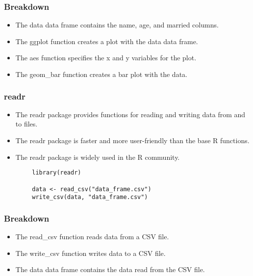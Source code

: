 \documentclass[serif, 9pt, aspectratio=32]{beamer}
\begin{document}
\begin{frame}
    \centering
    \frametitle{Breakdown}
    \begin{itemize}
        \setlength{\itemsep}{2em}
        \item The data data frame contains the name, age, and married columns.
        \item The ggplot function creates a plot with the data data frame.
        \item The aes function specifies the x and y variables for the plot.
        \item The geom\_bar function creates a bar plot with the data.
    \end{itemize}
\end{frame}

\begin{frame}
    \centering
    \frametitle{readr}
    \begin{itemize}
        \setlength{\itemsep}{2em}
        \item The readr package provides functions for reading and writing data from and to files.
        \item The readr package is faster and more user-friendly than the base R functions.
        \item The readr package is widely used in the R community.
    \end{itemize}
\end{frame}

\begin{frame}[fragile]
    \begin{lstlisting}
        library(readr)

        data <- read_csv("data_frame.csv")
        write_csv(data, "data_frame.csv")
    \end{lstlisting}
\end{frame}

\begin{frame}
    \centering
    \frametitle{Breakdown}
    \begin{itemize}
        \setlength{\itemsep}{2em}
        \item The read\_csv function reads data from a CSV file.
        \item The write\_csv function writes data to a CSV file.
        \item The data data frame contains the data read from the CSV file.
    \end{itemize}
\end{frame}
\end{document}
